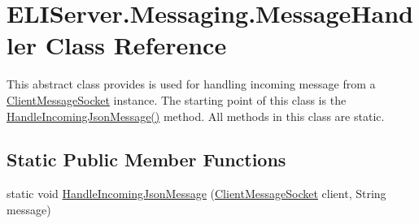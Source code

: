 \hypertarget{class_e_l_i_server_1_1_messaging_1_1_message_handler}{}\section{E\+L\+I\+Server.\+Messaging.\+Message\+Handler Class Reference}
\label{class_e_l_i_server_1_1_messaging_1_1_message_handler}


This abstract class provides is used for handling incoming message from a \hyperlink{class_e_l_i_server_1_1_messaging_1_1_client_message_socket}{Client\+Message\+Socket} instance. The starting point of this class is the \hyperlink{class_e_l_i_server_1_1_messaging_1_1_message_handler_a54b8fc68511fe197932338c0ffdb75c0}{Handle\+Incoming\+Json\+Message()} method. All methods in this class are static.  


\subsection*{Static Public Member Functions}
\begin{DoxyCompactItemize}
\item 
static void \hyperlink{class_e_l_i_server_1_1_messaging_1_1_message_handler_a54b8fc68511fe197932338c0ffdb75c0}{Handle\+Incoming\+Json\+Message} (\hyperlink{class_e_l_i_server_1_1_messaging_1_1_client_message_socket}{Client\+Message\+Socket} client, String message)
\end{DoxyCompactItemize}
